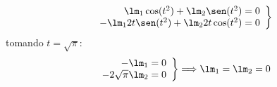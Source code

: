 \begin{ejemplo}
\begin{itemize}
            \begin{equation*}
                \left.\begin{array}{r}
                    \lm_1 \cos(t^2) + \lm_2\sen(t^2) = 0\\
                    -\lm_1 2t\sen(t^2) + \lm_2 2t\cos(t^2) = 0
                \end{array}\right\}
            \end{equation*}
            tomando $t = \sqrt{\pi}$:
            \begin{equation*}
                \left.\begin{array}{r}
                        -\lm_1 = 0 \\
                        -2\sqrt{\pi} \lm_2 = 0
                \end{array}\right\} \Longrightarrow \lm_1 = \lm_2 = 0
            \end{equation*}
    \end{itemize}
\end{ejemplo}

